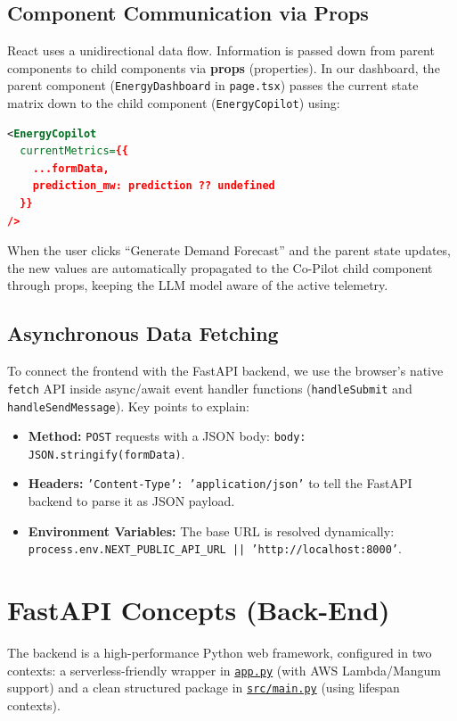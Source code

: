 \documentclass[11pt,a4paper]{article}
\begin{document}
\subsection{Component Communication via Props}
React uses a unidirectional data flow. Information is passed down from parent components to child components via \textbf{props} (properties).
In our dashboard, the parent component (\texttt{EnergyDashboard} in \texttt{page.tsx}) passes the current state matrix down to the child component (\texttt{EnergyCopilot}) using:
\begin{lstlisting}[language=XML]
<EnergyCopilot 
  currentMetrics={{
    ...formData,
    prediction_mw: prediction ?? undefined
  }} 
/>
\end{lstlisting}
When the user clicks ``Generate Demand Forecast'' and the parent state updates, the new values are automatically propagated to the Co-Pilot child component through props, keeping the LLM model aware of the active telemetry.

\subsection{Asynchronous Data Fetching}
To connect the frontend with the FastAPI backend, we use the browser's native \texttt{fetch} API inside async/await event handler functions (\texttt{handleSubmit} and \texttt{handleSendMessage}).
Key points to explain:
\begin{itemize}
    \item \textbf{Method:} \texttt{POST} requests with a JSON body: \texttt{body: JSON.stringify(formData)}.
    \item \textbf{Headers:} \texttt{'Content-Type': 'application/json'} to tell the FastAPI backend to parse it as JSON payload.
    \item \textbf{Environment Variables:} The base URL is resolved dynamically: \texttt{process.env.NEXT\_PUBLIC\_API\_URL || 'http://localhost:8000'}.
\end{itemize}

\section{FastAPI Concepts (Back-End)}
The backend is a high-performance Python web framework, configured in two contexts: a serverless-friendly wrapper in \href{file:///c:/Akhil/AI_Engineer/1stProject/app.py}{\texttt{app.py}} (with AWS Lambda/Mangum support) and a clean structured package in \href{file:///c:/Akhil/AI_Engineer/1stProject/src/main.py}{\texttt{src/main.py}} (using lifespan contexts).
\end{document}
